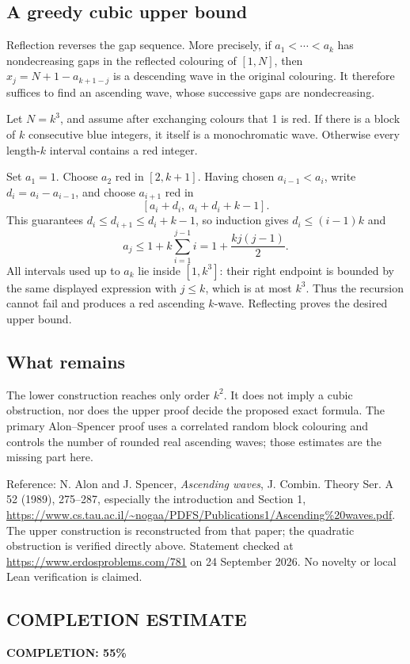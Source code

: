\subsection*{A greedy cubic upper bound}
Reflection reverses the gap sequence. More precisely, if
\(a_1<\cdots<a_k\) has nondecreasing gaps in the reflected colouring of \([1,N]\), then \(x_j=N+1-a_{k+1-j}\) is a descending wave in the original colouring. It therefore suffices to find an ascending wave, whose successive gaps are nondecreasing.

Let \(N=k^3\), and assume after exchanging colours that 1 is red. If there is a block of \(k\) consecutive blue integers, it itself is a monochromatic wave. Otherwise every length-\(k\) interval contains a red integer.

Set \(a_1=1\). Choose \(a_2\) red in \([2,k+1]\). Having chosen \(a_{i-1}<a_i\), write \(d_i=a_i-a_{i-1}\), and choose \(a_{i+1}\) red in
\[
[a_i+d_i,\ a_i+d_i+k-1].
\]
This guarantees \(d_i\leq d_{i+1}\leq d_i+k-1\), so induction gives \(d_i\leq(i-1)k\) and
\[
a_j\leq1+k\sum_{i=1}^{j-1}i
=1+\frac{k j(j-1)}2.
\]
All intervals used up to \(a_k\) lie inside \([1,k^3]\): their right endpoint is bounded by the same displayed expression with \(j\leq k\), which is at most \(k^3\). Thus the recursion cannot fail and produces a red ascending \(k\)-wave. Reflecting proves the desired upper bound.

\subsection*{What remains}
The lower construction reaches only order \(k^2\). It does not imply a cubic obstruction, nor does the upper proof decide the proposed exact formula. The primary Alon--Spencer proof uses a correlated random block colouring and controls the number of rounded real ascending waves; those estimates are the missing part here.

Reference: N. Alon and J. Spencer, \emph{Ascending waves}, J. Combin. Theory Ser. A 52 (1989), 275--287, especially the introduction and Section 1, \url{https://www.cs.tau.ac.il/~nogaa/PDFS/Publications1/Ascending%20waves.pdf}. The upper construction is reconstructed from that paper; the quadratic obstruction is verified directly above. Statement checked at \url{https://www.erdosproblems.com/781} on 24 September 2026. No novelty or local Lean verification is claimed.
\subsection*{COMPLETION ESTIMATE}
\textbf{COMPLETION: 55\%}
